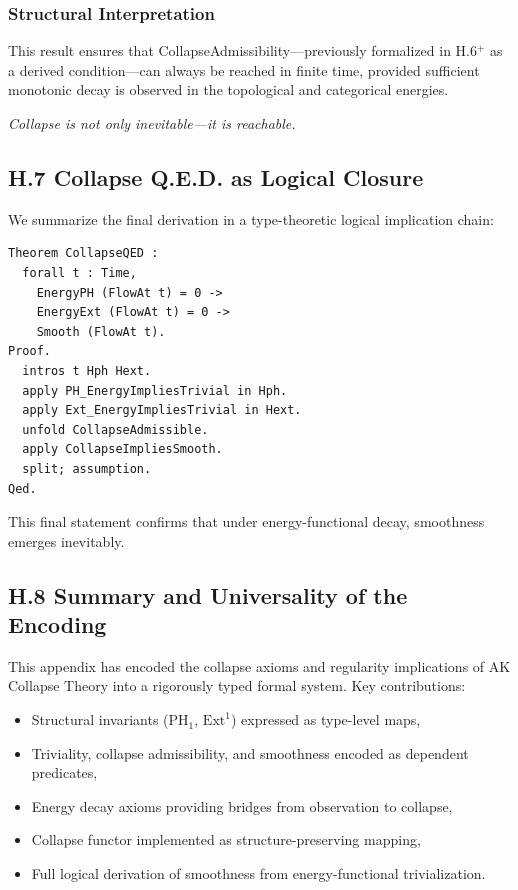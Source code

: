 \documentclass[11pt]{article}
\begin{document}
\subsubsection*{Structural Interpretation}

This result ensures that CollapseAdmissibility—previously formalized in H.6$^{+}$ as a derived condition—can always be reached in finite time, provided sufficient monotonic decay is observed in the topological and categorical energies.

\begin{center}
\emph{Collapse is not only inevitable—it is reachable.}
\end{center}


\subsection{H.7 Collapse Q.E.D. as Logical Closure}

We summarize the final derivation in a type-theoretic logical implication chain:

\begin{lstlisting}[language=Coq, caption=Collapse Q.E.D.]
Theorem CollapseQED :
  forall t : Time,
    EnergyPH (FlowAt t) = 0 ->
    EnergyExt (FlowAt t) = 0 ->
    Smooth (FlowAt t).
Proof.
  intros t Hph Hext.
  apply PH_EnergyImpliesTrivial in Hph.
  apply Ext_EnergyImpliesTrivial in Hext.
  unfold CollapseAdmissible.
  apply CollapseImpliesSmooth.
  split; assumption.
Qed.
\end{lstlisting}

This final statement confirms that under energy-functional decay, smoothness emerges inevitably.


\subsection{H.8 Summary and Universality of the Encoding}

This appendix has encoded the collapse axioms and regularity implications of AK Collapse Theory into a rigorously typed formal system. Key contributions:

\begin{itemize}
  \item Structural invariants ($\mathrm{PH}_1$, $\mathrm{Ext}^1$) expressed as type-level maps,
  \item Triviality, collapse admissibility, and smoothness encoded as dependent predicates,
  \item Energy decay axioms providing bridges from observation to collapse,
  \item Collapse functor implemented as structure-preserving mapping,
  \item Full logical derivation of smoothness from energy-functional trivialization.
\end{itemize}
\end{document}
